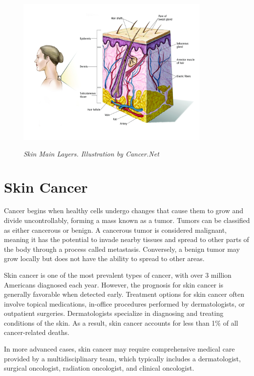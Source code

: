 \begin{figure}[H] \centering
  \includegraphics[width=0.85\textwidth]{imatges/problem_domain/melanoma-diagram.jpg}
  \caption[Skin Main Layers]{\textit{Skin Main Layers. Illustration by
Cancer.Net}} {\label{fig:melanoma_diagram}} \end{figure}

\section{Skin Cancer}

Cancer begins when healthy cells undergo changes that cause them to grow and
divide uncontrollably, forming a mass known as a tumor. Tumors can be
classified as either cancerous or benign. A cancerous tumor is considered
malignant, meaning it has the potential to invade nearby tissues and spread to
other parts of the body through a process called metastasis. Conversely, a
benign tumor may grow locally but does not have the ability to spread to other
areas. \newline

Skin cancer is one of the most prevalent types of cancer, with over 3 million
Americans diagnosed each year. However, the prognosis for skin cancer is
generally favorable when detected early. Treatment options for skin cancer
often involve topical medications, in-office procedures performed by
dermatologists, or outpatient surgeries. Dermatologists specialize in
diagnosing and treating conditions of the skin. As a result, skin cancer
accounts for less than 1\% of all cancer-related deaths. \newline

In more advanced cases, skin cancer may require comprehensive medical care
provided by a multidisciplinary team, which typically includes a dermatologist,
surgical oncologist, radiation oncologist, and clinical oncologist.


